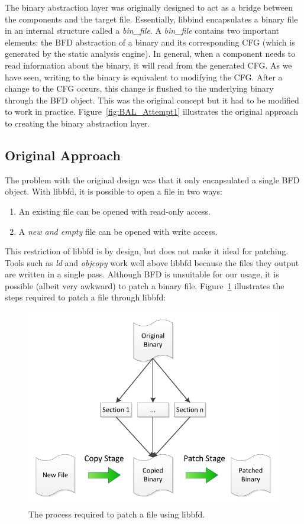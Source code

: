 The binary abstraction layer was originally designed to act as a bridge between the components and the target file. Essentially, libbind encapsulates a binary file in an internal structure called a \emph{bin\_file}. A \emph{bin\_file} contains two important elements: the BFD abstraction of a binary and its corresponding CFG (which is generated by the static analysis engine). In general, when a component needs to read information about the binary, it will read from the generated CFG. As we have seen, writing to the binary is equivalent to modifying the CFG. After a change to the CFG occurs, this change is flushed to the underlying binary through the BFD object. This was the original concept but it had to be modified to work in practice. Figure~\ref{fig:BAL_Attempt1} illustrates the original approach to creating the binary abstraction layer.

\subsection{Original Approach}

The problem with the original design was that it only encapsulated a single BFD object. With libbfd, it is possible to open a file in two ways:

\begin{enumerate}
\item An existing file can be opened with read-only access.
\item A \emph{new and empty} file can be opened with write access.
\end{enumerate}

This restriction of libbfd is by design, but does not make it ideal for patching. Tools such as \emph{ld} and \emph{objcopy} work well above libbfd because the files they output are written in a single pass. Although BFD is unsuitable for our usage, it is possible (albeit very awkward) to patch a binary file. Figure~\ref{fig:BAL_Approach1} illustrates the steps required to patch a file through libbfd:

\begin{figure}[H]
 \centering
 \includegraphics{Binary_Abstraction_Layer_Approach1.pdf}
 \caption{The process required to patch a file using libbfd.}
\label{fig:BAL_Approach1}
\end{figure}

